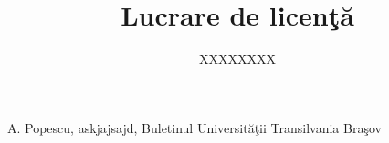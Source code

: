 \documentclass[a4paper, 12pt]{report}
\title{Lucrare de licen\c t\u a}
\author{XXXXXXXX}
\begin{document}
\maketitle


\listoffigures
\listoftables

\tableofcontents











\begin{thebibliography}{999}
A. Popescu, askjajsajd, Buletinul Universit\u a\c tii Transilvania Bra\c sov
\end{thebibliography}
\end{document}
